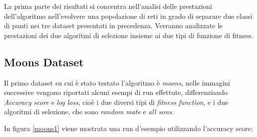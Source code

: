 \documentclass[12pt,a4paper]{report}
\begin{document}
La prima parte dei risultati si concentra nell'analisi delle prestazioni dell'algoritmo nell'evolvere una popolazione di reti in grado di separare due classi di punti nei tre dataset presentati in precedenza. Verranno analizzate le prestazioni dei due algoritmi di selezione insieme ai due tipi di funzione di fitness.

\subsection{Moons Dataset}

Il primo dataset su cui è stato testato l'algoritmo è \textit{moons}, nelle immagini successive vengono riportati alcuni esempi di run effettute, differenziando \textit{Accuracy score} e \textit{log loss}, cioè i due diversi tipi di \textit{fitness function}, e i due algoritmi di selezione, che sono \textit{random mate} e \textit{all sons}.

In figura \ref{moons1} viene mostrata una run d'esempio utilizzando l'accuracy score:
\end{document}
